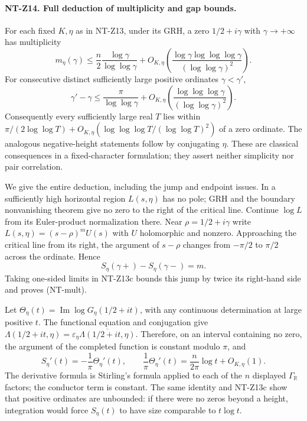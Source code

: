 \paragraph{NT-Z14. Full deduction of multiplicity and gap bounds.}
For each fixed $K,\eta$ as in NT-Z13, under its GRH, a zero
$1/2+i\gamma$ with $\gamma\to+\infty$ has multiplicity
\[
 m_\eta(\gamma)\le\frac n2\frac{\log\gamma}{\log\log\gamma}
   +O_{K,\eta}\left(
    \frac{\log\gamma\log\log\log\gamma}{(\log\log\gamma)^2}\right).
\tag{NT-mult}
\]
For consecutive distinct sufficiently large positive ordinates
$\gamma<\gamma'$,
\[
 \gamma'-\gamma\le\frac{\pi}{\log\log\gamma}
   +O_{K,\eta}\left(
    \frac{\log\log\log\gamma}{(\log\log\gamma)^2}\right).
\tag{NT-gap}
\]
Consequently every sufficiently large real $T$ lies within
$\pi/(2\log\log T)+O_{K,\eta}(
\log\log\log T/(\log\log T)^2)$ of a zero ordinate.  The analogous
negative-height statements follow by conjugating $\eta$.  These are
classical consequences in a fixed-character formulation; they assert
neither simplicity nor pair correlation.

We give the entire deduction, including the jump and endpoint issues.
In a sufficiently high horizontal region $L(s,\eta)$ has no pole;
GRH and the boundary nonvanishing theorem give no zero to the right
of the critical line.  Continue $\log L$ from its Euler-product
normalization there.  Near $\rho=1/2+i\gamma$ write
$L(s,\eta)=(s-\rho)^m U(s)$ with $U$ holomorphic and nonzero.
Approaching the critical line from its right, the argument of
$s-\rho$ changes from $-\pi/2$ to $\pi/2$ across the ordinate.
Hence
\[
 S_\eta(\gamma+)-S_\eta(\gamma-)=m.
\]
Taking one-sided limits in NT-Z13c bounds this jump by twice its
right-hand side and proves (NT-mult).

Let $\Theta_\eta(t)=\operatorname{Im}\log G_\eta(1/2+it)$, with
any continuous determination at large positive $t$.
The functional equation and conjugation give
$\Lambda(1/2+it,\eta)=\varepsilon_\eta
\overline{\Lambda(1/2+it,\eta)}$.
Therefore, on an interval containing no zero, the argument of the
completed function is constant modulo $\pi$, and
\[
 S_\eta'(t)=-\frac1\pi\Theta_\eta'(t),\qquad
 \frac1\pi\Theta_\eta'(t)
    =\frac n{2\pi}\log t+O_{K,\eta}(1).
\tag{NT-phase}
\]
The derivative formula is Stirling's formula applied to each of the
$n$ displayed $\Gamma_{\mathbb R}$ factors; the conductor term is
constant.  The same identity and NT-Z13c show that positive ordinates
are unbounded: if there were no zeros beyond a height, integration
would force $S_\eta(t)$ to have size comparable to $t\log t$.

